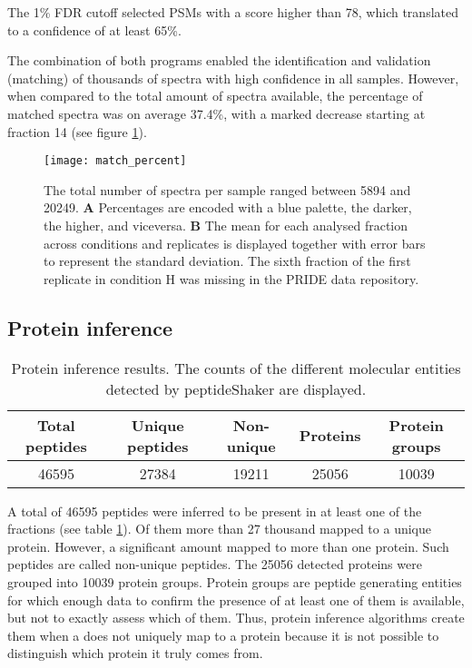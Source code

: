  The 1\% FDR cutoff selected PSMs with a score higher than 78, which translated to a confidence of at least 65\%.


The combination of both programs enabled the identification and validation (matching) of thousands of spectra with high confidence in all samples. However, when compared to the total amount of spectra available, the percentage of matched spectra was on average 37.4\%, with a marked decrease starting at fraction 14 (see figure \ref{fig:match_percent}).

\begin{figure}[!h]
\texttt{[image: match\_percent]}
\caption[Percentage of matched spectra in all samples]{The total number of spectra per sample ranged between 5894 and 20249. \textbf{A} Percentages are encoded with a blue palette, the darker, the higher, and viceversa. \textbf{B} The mean for each analysed fraction across conditions and replicates is displayed together with error bars to represent the standard deviation. The sixth fraction of the first replicate in condition H was missing in the PRIDE data repository.}
\label{fig:match_percent}
\end{figure}

\subsection{Protein inference}

\begin{table}[H]
\begin{tabular}{ccccc}
  \toprule
 Total peptides & Unique peptides & Non-unique & Proteins & Protein groups \\ 
  \midrule
 46595 & 27384 & 19211 & 25056 & 10039 \\
 \bottomrule
\end{tabular}
\caption[rotein inference results]{Protein inference results. The counts of the different molecular entities detected by peptideShaker are displayed.}
\label{tab:protein_inference}
\end{table}

A total of 46595 peptides were inferred to be present in at least one of the fractions (see table \ref{tab:protein_inference}). Of them more than 27 thousand mapped to a unique protein. However, a significant amount mapped to more than one protein. Such peptides are called non-unique peptides. The 25056 detected proteins were grouped into 10039 protein groups. Protein groups are peptide generating entities for which enough data to confirm the presence of at least one of them is available, but not to exactly assess which of them. Thus, protein inference algorithms create them when a does not uniquely map to a protein because it is not possible to distinguish which protein it truly comes from.

